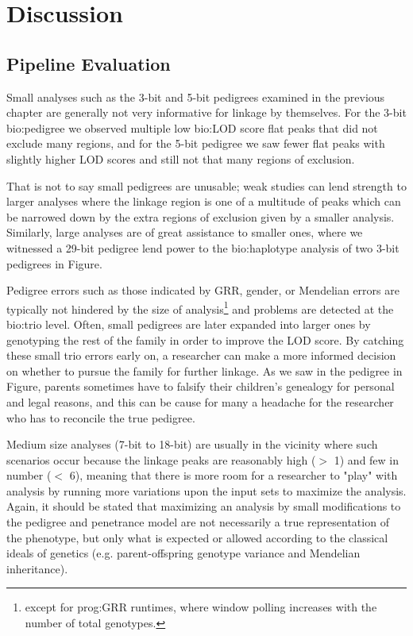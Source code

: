 \chapter{Discussion}

\section{Pipeline Evaluation}

Small analyses such as the 3-bit and 5-bit pedigrees examined in the previous chapter are generally not very informative for linkage by themselves. For the 3-bit \gls{bio:pedigree} we observed multiple low \gls{bio:LOD} score flat peaks that did not exclude many regions, and for the 5-bit pedigree we saw fewer flat peaks with slightly higher LOD scores and still not that many regions of exclusion.

That is not to say small pedigrees are unusable; weak studies can lend strength to larger analyses where the linkage region is one of a multitude of peaks which can be narrowed down by the extra regions of exclusion given by a smaller analysis. Similarly, large analyses are of great assistance to smaller ones, where we witnessed a 29-bit pedigree lend power to the \gls{bio:haplotype} analysis of two 3-bit pedigrees in Figure.

Pedigree errors such as those indicated by GRR, gender, or Mendelian errors are typically not hindered by the size of analysis\footnote{except for \gls{prog:GRR} runtimes, where window polling increases with the number of total genotypes.} and problems are detected at the \gls{bio:trio} level. Often, small pedigrees are later expanded into larger ones by genotyping the rest of the family in order to improve the LOD score. By catching these small trio errors early on, a researcher can make a more informed decision on whether to pursue the family for further linkage. As we saw in the pedigree in Figure, parents sometimes have to falsify their children's genealogy for personal and legal reasons, and this can be cause for many a headache for the researcher who has to reconcile the true pedigree.

Medium size analyses (7-bit to 18-bit) are usually in the vicinity where such scenarios occur because the linkage peaks are reasonably high ($>$ 1) and few in number ($<$ 6), meaning that there is more room for a researcher to "play" with analysis by running more variations upon the input sets to maximize the analysis. Again, it should be stated that maximizing an analysis by small modifications to the pedigree and penetrance model are not necessarily a true representation of the phenotype, but only what is expected or allowed according to the classical ideals of genetics (e.g. parent-offspring genotype variance and Mendelian inheritance).

